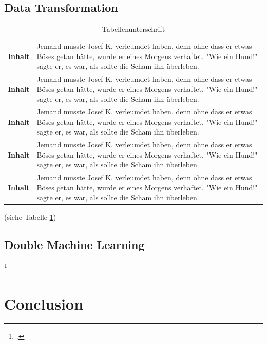     \section{Data Transformation}
    \begin{table}[H]
        \begin{tabular}{p{}p{}}
            \textbf{Inhalt} & Jemand musste Josef K. verleumdet haben, denn ohne dass er etwas Böses getan hätte, wurde er eines Morgens verhaftet. "Wie ein Hund!" sagte er, es war, als sollte die Scham ihn überleben.\\
            \textbf{Inhalt} & Jemand musste Josef K. verleumdet haben, denn ohne dass er etwas Böses getan hätte, wurde er eines Morgens verhaftet. "Wie ein Hund!" sagte er, es war, als sollte die Scham ihn überleben.\\
            \textbf{Inhalt} & Jemand musste Josef K. verleumdet haben, denn ohne dass er etwas Böses getan hätte, wurde er eines Morgens verhaftet. "Wie ein Hund!" sagte er, es war, als sollte die Scham ihn überleben.\\
            \textbf{Inhalt} & Jemand musste Josef K. verleumdet haben, denn ohne dass er etwas Böses getan hätte, wurde er eines Morgens verhaftet. "Wie ein Hund!" sagte er, es war, als sollte die Scham ihn überleben.\\
            \textbf{Inhalt} & Jemand musste Josef K. verleumdet haben, denn ohne dass er etwas Böses getan hätte, wurde er eines Morgens verhaftet. "Wie ein Hund!" sagte er, es war, als sollte die Scham ihn überleben.\\
        \end{tabular}
        \caption{Tabellenunterschrift}
        \label{tabe3}
    \end{table}
    \blindtext (siehe Tabelle \ref{tabe3})

    \section{Double Machine Learning}
    \blindtext\footcite[see][1]{voli2020}
\clearpage
\chapter{Conclusion}
    \blindtext
\clearpage